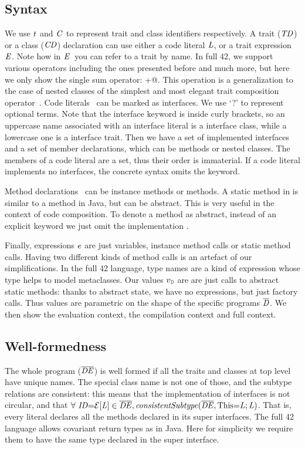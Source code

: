 \subsection{Syntax}
\saveSpace
We use $\mathit{t}$ and $\mathit{C}$ to represent trait and class identifiers respectively.
A trait ($\mathit{TD}$) or a class ($\mathit{CD}$) declaration can use either a code literal $\mathit{L}$, or a trait
expression $\mathit{E}$. Note how in $\mathit{E}$\ you can refer to a trait by name.
In full 42, we support various operators including the ones presented before and much more,
 but here we only show the single sum operator: \Q@+@.
This operation is a generalization to the case of nested classes of the simplest and most elegant
trait composition operator~\cite{ducasse2006traits}.
Code literals \mL\ can be marked as interfaces. We use `?' to represent optional terms.
Note that the interface keyword is inside curly brackets,
so an uppercase name associated with an interface literal is a interface class, while a lowercase one is a interface trait.
Then we have a set of implemented interfaces and a set of member
declarations, which can be methods or nested classes.
The members of a code literal are a set, thus their order is immaterial.
If a code literal implements no interfaces, the concrete syntax omits the \Q@implements@ keyword.

Method declarations \mMD~can be instance methods or \Q@static@ methods. 
A static method in \name is similar to a \Q@static@ method in Java, but can be abstract.
This is very useful in the context of code composition.
To denote a method as abstract, instead of an explicit keyword we just omit the implementation \me.

Finally, expressions $\mathit{e}$ are just variables, instance method calls or static method calls.
Having two different kinds of method calls is an artefact of our simplifications.
In the full 42 language, type names are a kind of expression whose type helps to model metaclasses.
Our values $v_{{\smallDs}}$ are
are just calls to abstract static methods:
thanks to abstract state, we have no \Q@new@ expressions, but just factory calls.
Thus values are parametric on the shape of the specific programs $\overline{\mathit{D}}$.
We then show the evaluation context, the compilation context and full
context.
\saveSpace
\subsection{Well-formedness}
\saveSpace
The whole program ($\overline{\mathit{DE}}$) is well formed if
all the traits and classes at top level have unique names. The special class name
\Q@This@ is not one of those,
and the subtype relations are consistent:
this means that the implementation of interfaces is not circular,
and that $\forall\ \mID\terminalCode{=}\ctx[\mL]\in\overline\mDE, \mathit{consistentSubtype}(\overline\mDE,\terminalCode{This=}\mL;\mL)$.
\quad That is, every literal declares
all the methods declared in its super interfaces.
The full 42 language allows covariant return types as in Java.
Here for simplicity we require them to have the same type declared in the super interface.


